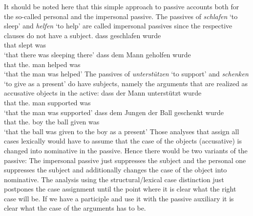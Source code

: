It should be noted here that this simple approach to passive accounts both for the so-called
personal and the impersonal passive. The passives of \emph{schlafen} `to sleep' and \emph{helfen}
`to help' are called impersonal passives since the respective clauses do not have a subject. 
\eal
\ex 
\gll dass geschlafen wurde\\
     that slept was\\
\glt `that there was sleeping there'
\ex
\gll dass dem Mann geholfen wurde\\
     that the.\DAT{} man helped was\\
\glt `that the man was helped'
\zl
The passives of \emph{unterstützen} `to support' and \emph{schenken} `to give as a present' do have
subjects, namely the arguments that are realized as accusative objects in the active:
\eal
\ex 
\gll dass der Mann unterstützt wurde\\
     that the.\NOM{} man supported was\\
\glt `that the man was supported'
\ex
\gll dass dem Jungen der Ball geschenkt wurde\\
     that the.\DAT{} boy the\NOM{} ball given was\\
\glt `that the ball was given to the boy as a present'
\zl
Those analyses that assign all cases lexically would have to assume that the case of the objects
(accusative) is changed into nominative in the passive. Hence there would be two variants of the
passive: The impersonal passive just suppresses the subject and the personal one suppresses the
subject and additionally changes the case of the object into nominative. The analysis using the
structural/lexical case distinction just postpones the case assignment until the point where it is
clear what the right case will be. If we have a participle and use it with the passive auxiliary it
is clear what the case of the arguments has to be.





